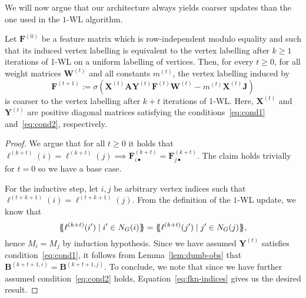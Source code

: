 We will now argue that 
our architecture always yields coarser updates than the
one used in the $1$-WL algorithm.
\begin{proposition}\label{pro:upper-bound}
Let $\mathbf{F}^{(0)}$ be a feature matrix which is row-independent modulo equality and
such that its induced vertex labelling is equivalent to the vertex labelling after $k\geq 1$ iterations of 1-WL on a uniform labelling of vertices. Then, for every $t\geq 0$, for all weight matrices $\mathbf{W}^{(t)}$ and all constants $m^{(t)}$, the vertex labelling induced by 
$$\mathbf{F}^{(t+1)}:=\sigma(\mathbf{X}^{(t)}\mathbf{A}\mathbf{Y}^{(t)}\mathbf{F}^{(t)}\mathbf{W}^{(t)} - m^{(t)}\mathbf{X}^{(t)}\mathbf{J}) $$
is coarser to the vertex labelling after $k+t$ iterations of 1-WL. Here, $\mathbf{X}^{(t)}$ and $\mathbf{Y}^{(t)}$ are positive diagonal matrices satisfying the conditions~\eqref{eq:cond1} and~\eqref{eq:cond2}, respectively. 
\end{proposition}
\begin{proof}
    We argue that for all $t \geq 0$ it holds that $\ell^{(k+t)}(i) = \ell^{(k+t)}(j)
    \implies \mathbf{F}^{(k+t)}_{i\bullet}
    = \mathbf{F}^{(k+t)}_{j\bullet}$. The
    claim holds trivially for $t=0$ so we have a base case.
    
    For the inductive step, let $i,j$ be 
    arbitrary vertex indices such that
    $\ell^{(t+k+1)}(i)=\ell^{(t+k+1)}(j)$.
    From the definition of the $1$-WL
    update, we know that
    \[
        \ldbl \ell^{(k+t)}(i') \st i' \in N_G(i) \rdbl
        =
        \ldbl \ell^{(k+t)}(j') \st j' \in N_G(j) \rdbl,
    \]
    hence $M_i = M_j$ by induction hypothesis.
    Since we have assumed $\mathbf{Y}^{(t)}$
    satisfies condition~\eqref{eq:cond1}, it follows from Lemma~\ref{lem:dumb-obs} that $\mathbf{B}^{(k+t+1,i)} = \mathbf{B}^{(k+t+1,j)}$. To conclude, we
    note that since we have further assumed condition~\eqref{eq:cond2} holds, Equation~\eqref{eq:fkn-indices} gives us
    the desired result.
\end{proof}


